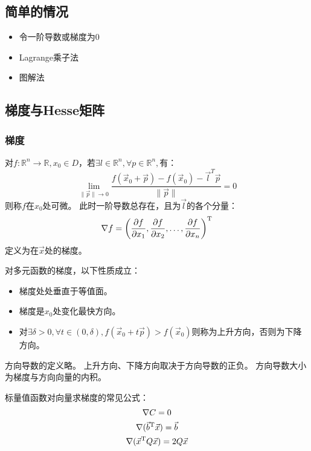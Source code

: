 \subsection{简单的情况}

\begin{itemize}
    \item 令一阶导数或梯度为$0$
    \item Lagrange乘子法
    \item 图解法
\end{itemize}

\subsection{梯度与Hesse矩阵}
\subsubsection{梯度}

\begin{definition}[可微]
    对$f:\mathbb{R}^n\to\mathbb{R},x_0\in D$，若$\exists l\in\mathbb{R}^n,\forall p\in\mathbb{R}^n,$有：
    \[
        \lim _{\| \vec{p} \| \rightarrow 0} \frac{f(\vec{x}_{0}+\vec{p})-f(\vec{x}_{0})-\vec{l}^{T} \vec{p}}{\|\vec{p}\|}=0
    \]
    则称$f$在$x_0$处可微。
    此时一阶导数总存在，且为$\vec{l}$的各个分量：
    \[
        \nabla f = \left( \frac{\partial f}{\partial x_1}, \frac{\partial f}{\partial x_2}, \dots, \frac{\partial f}{\partial x_n} \right)^\mathrm{T}
    \]
    定义为在$\vec{x}$处的梯度。
\end{definition}

\begin{property}
    对多元函数的梯度，以下性质成立：
    \begin{itemize}
        \item 梯度处处垂直于等值面。
        \item 梯度是$x_0$处变化最快方向。
        \item 对$\exists \delta>0,\forall t\in (0,\delta), f(\vec{x}_0+t\vec{p})>f(\vec{x}_0)$则称为上升方向，否则为下降方向。
    \end{itemize}
\end{property}

方向导数的定义略。
上升方向、下降方向取决于方向导数的正负。
方向导数大小为梯度与方向向量的内积。

标量值函数对向量求梯度的常见公式：
\begin{gather*}
    \nabla C = 0 \\
    \nabla (\vec{b}^\mathrm{T} \vec{x})=\vec{b} \\
    \nabla (\vec{x}^\mathrm{T} Q \vec{x})=2Q\vec{x} \\
\end{gather*}

